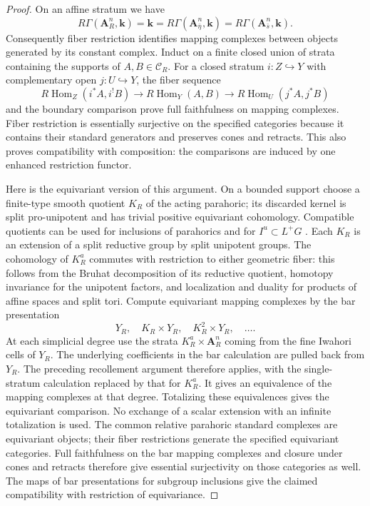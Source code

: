 \begin{proof}
On an affine stratum we have
\[
 R\Gamma(\mathbf A_R^n,\mathbf k)=\mathbf k
 =R\Gamma(\mathbf A_{\bar\eta}^n,\mathbf k)
 =R\Gamma(\mathbf A_{\bar s}^n,\mathbf k).
\]
Consequently fiber restriction identifies mapping complexes between
objects generated by its constant complex. Induct on a finite closed
union of strata containing the supports of $A,B\in\mathscr C_R$.
For a closed stratum $i:Z\hookrightarrow Y$ with complementary open
$j:U\hookrightarrow Y$, the fiber sequence
\[
 R\operatorname{Hom}_Z(i^*A,i^!B)
 \longrightarrow R\operatorname{Hom}_Y(A,B)
 \longrightarrow R\operatorname{Hom}_U(j^*A,j^*B)
\]
and the boundary comparison prove full faithfulness on mapping
complexes. Fiber restriction is essentially surjective on the specified
categories because it contains their standard generators and preserves
cones and retracts. This also proves compatibility with composition:
the comparisons are induced by one enhanced restriction functor.

Here is the equivariant version of this argument. On a bounded support
choose a finite-type smooth quotient $K_R$ of the acting parahoric;
its discarded kernel is split pro-unipotent and has trivial positive
equivariant cohomology. Compatible quotients can be used for inclusions
of parahorics and for $I^u\subset L^+G$
\cite[Lemma~2.18]{RicharzScholbach}. Each $K_R$ is an extension of a
split reductive group by split unipotent groups. The cohomology of
$K_R^a$ commutes with restriction to either geometric fiber: this
follows from the Bruhat decomposition of its reductive quotient,
homotopy invariance for the unipotent factors, and localization and
duality for products of affine spaces and split tori. Compute
equivariant mapping complexes by the bar presentation
\[
 Y_R,\quad K_R\times Y_R,\quad K_R^2\times Y_R,\quad\ldots.
\]
At each simplicial degree use the strata
$K_R^a\times\mathbf A_R^n$ coming from the fine Iwahori cells of
$Y_R$. The underlying coefficients in the bar calculation are pulled
back from $Y_R$. The preceding recollement argument therefore applies,
with the single-stratum calculation replaced by that for $K_R^a$.
It gives an equivalence of the mapping complexes at that degree.
Totalizing these equivalences gives the equivariant comparison. No
exchange of a scalar extension with an infinite totalization is used.
The common relative parahoric standard complexes are equivariant
objects; their fiber restrictions generate the specified equivariant
categories. Full faithfulness on the bar mapping complexes and
closure under cones and retracts therefore give essential
surjectivity on those categories as well.
The maps of bar presentations for subgroup inclusions give the claimed
compatibility with restriction of equivariance.


\end{proof}
